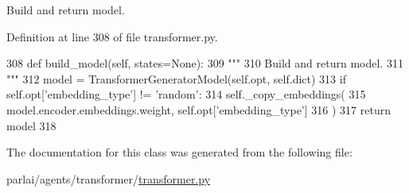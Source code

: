 \begin{DoxyVerb}Build and return model.
\end{DoxyVerb}
 

Definition at line 308 of file transformer.\+py.


\begin{DoxyCode}
308     \textcolor{keyword}{def }build\_model(self, states=None):
309         \textcolor{stringliteral}{"""}
310 \textcolor{stringliteral}{        Build and return model.}
311 \textcolor{stringliteral}{        """}
312         model = TransformerGeneratorModel(self.opt, self.dict)
313         \textcolor{keywordflow}{if} self.opt[\textcolor{stringliteral}{'embedding\_type'}] != \textcolor{stringliteral}{'random'}:
314             self.\_copy\_embeddings(
315                 model.encoder.embeddings.weight, self.opt[\textcolor{stringliteral}{'embedding\_type'}]
316             )
317         \textcolor{keywordflow}{return} model
318 \end{DoxyCode}


The documentation for this class was generated from the following file\+:\begin{DoxyCompactItemize}
\item 
parlai/agents/transformer/\hyperlink{transformer_8py}{transformer.\+py}\end{DoxyCompactItemize}
